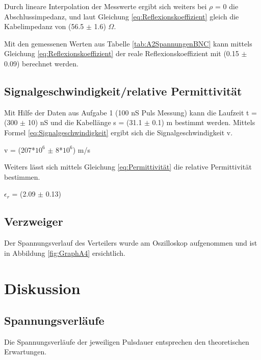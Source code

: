 \documentclass[12pt,a4paper,twoside]{article}
\begin{document}
\noindent
Durch lineare Interpolation der Messwerte ergibt sich weiters bei $\rho$ = 0 die Abschlussimpedanz, und laut Gleichung \ref{eq:Reflexionskoeffizient} gleich die Kabelimpedanz von (56.5 $\pm$ 1.6) $\Omega$. \newline

\noindent
Mit den gemessenen Werten aus Tabelle \ref{tab:A2SpannungenBNC} kann mittels Gleichung \ref{eq:Reflexionskoeffizient} der reale Reflexionskoeffizient mit (0.15 $\pm$ 0.09) berechnet werden.


\subsection{Signalgeschwindigkeit/relative Permittivität}

Mit Hilfe der Daten aus Aufgabe 1 (100 nS Puls Messung) kann die Laufzeit t = (300 $\pm$ 10) nS und die Kabellänge s = (31.1 $\pm$ 0.1) m bestimmt werden.
Mittels Formel \ref{eq:Signalgeschwindigkeit} ergibt sich die Signalgeschwindigkeit v. \newline

\noindent
v = (207*$10^6$ $\pm$ 8*$10^6$) m/s \newline

\noindent
Weiters lässt sich mittels Gleichung \ref{eq:Permittivität} die relative Permittivität bestimmen.

\noindent
$\epsilon_r$ = (2.09 $\pm$ 0.13) \newline


\subsection{Verzweiger}

Der Spannungsverlauf des Verteilers wurde am Oszilloskop aufgenommen und ist in Abbildung \ref{fig:GraphA4} ersichtlich.


\section{Diskussion} %

\subsection{Spannungsverläufe}

Die Spannungsverläufe der jeweiligen Pulsdauer entsprechen den theoretischen Erwartungen.
\end{document}
